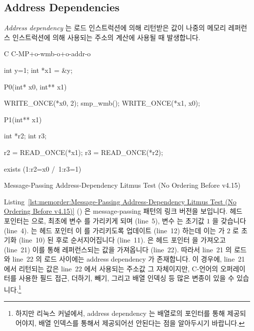 \subsection{Address Dependencies}
\label{sec:memorder:Address Dependencies}

\emph{Address dependency} 는 로드 인스트럭션에 의해 리턴받은 값이 나중의 메모리
레퍼런스 인스트럭션에 의해 사용되는 주소의 계산에 사용될 때 발생합니다.

\begin{listing}[tbp]
{ \scriptsize
\begin{verbbox}[\LstLineNo]
C C-MP+o-wmb-o+o-addr-o

{
int y=1;
int *x1 = &y;
}

P0(int* x0, int** x1) {

  WRITE_ONCE(*x0, 2);
  smp_wmb();
  WRITE_ONCE(*x1, x0);

}

P1(int** x1) {

  int *r2;
  int r3;

  r2 = READ_ONCE(*x1);
  r3 = READ_ONCE(*r2);

}

exists (1:r2=x0 /\ 1:r3=1)
\end{verbbox}
}
\centering
\theverbbox
\caption{Message-Passing Address-Dependency Litmus Test (No Ordering Before v4.15)}
\label{lst:memorder:Message-Passing Address-Dependency Litmus Test (No Ordering Before v4.15)}
\end{listing}

Listing~\ref{lst:memorder:Message-Passing Address-Dependency Litmus Test (No Ordering Before v4.15)}
()
은 message-passing 패턴의 링크 버전을 보입니다.
헤드 포인터는  으로, 최초에  변수  를 가리키게 되며
(line~5), 변수  는 초기값 $1$ 을 갖습니다 (line~4).
 는 헤드 포인터  이  를 가리키도록 업데이트 (line~12)
하는데 이는  가 $2$ 로 초기화 (line~10) 된 후로 순서지어집니다
(line~11).
 은 헤드 포인터  을 가져오고 (line~21) 이를 통해 레퍼런스되는
값을 가져옵니다 (line~22).
따라서 line~21 의 로드와 line~22 의 로드 사이에는 address dependency 가
존재합니다.
이 경우에, line~21 에서 리턴되는 값은 line~22 에서 사용되는 주소값 그
자체이지만, C-언어의 \co{->} 오퍼레이터를 사용한 필드 접근, 더하기, 빼기,
그리고 배열 인덱싱 등 많은 변종이 있을 수 있습니다.\footnote{
	하지만 리눅스 커널에서, address dependency 는 배열로의 포인터를 통해
	제공되어야지, 배열 인덱스를 통해서 제공되어선 안된다는 점을 알아두시기
	바랍니다.}
\iffalse

